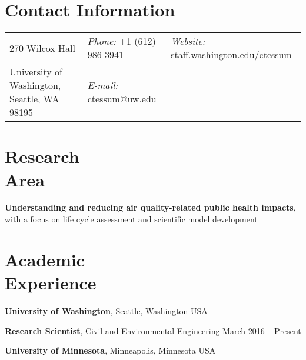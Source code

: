 \documentclass[margin,line,10pt]{res}
\newenvironment{list1}{
  \begin{list}{\ding{113}}{%
      \setlength{\itemsep}{0in}
      \setlength{\parsep}{0in} \setlength{\parskip}{0in}
      \setlength{\topsep}{0in} \setlength{\partopsep}{0in}
      \setlength{\leftmargin}{0.17in}}}{\end{list}}
\begin{document}
\thispagestyle{empty}

\begin{resume}
\section{\sc Contact Information}
\vspace{.05in}
\begin{tabular}{@{}p{1.6in}p{1.7in}p{2.5in}}
270 Wilcox Hall &
{\it Phone:} +1 (612) 986-3941 &
{\it Website:} \url{staff.washington.edu/ctessum} \\
University of Washington, Seattle, WA 98195 &
{\it E-mail:}  ctessum@uw.edu & \\
\end{tabular}

\section{\sc Research\\Area}

\textbf{Understanding and reducing air quality-related public health impacts}, with a focus on life cycle assessment and scientific model development


\section{\sc Academic\\Experience}

\textbf{University of Washington}, Seattle, Washington USA\\

\vspace*{-.1in}

\begin{list1}
\item[] \textbf{Research Scientist}, Civil and Environmental Engineering \hfill March 2016 -- Present\\
\end{list1}

\vspace*{-.2in}

\textbf{University of Minnesota}, Minneapolis, Minnesota USA\\


\end{resume}
\end{document}

